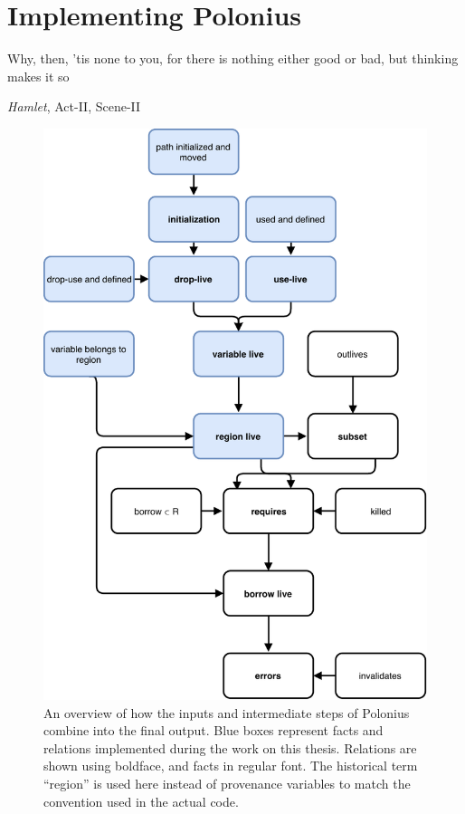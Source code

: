 \documentclass[11pt,a4paper,twoside,openany]{report}
\begin{document}
\chapter{Implementing Polonius}\label{cha:implementation}

\epigraph{Why, then, 'tis none to you, for there is nothing either good or bad,
  but thinking makes it so}%
{\textit{Hamlet}, Act-II, Scene-II}

\begin{figure}
  \includegraphics[width=0.9\linewidth]{Graphs/polonius-overview}
  \caption[Flowchart of the Polonius Inputs and Outputs]{An overview of how the
    inputs and intermediate steps of Polonius combine into the final output.
    Blue boxes represent facts and relations implemented during the work on this
    thesis. Relations are shown using boldface, and facts in regular font. The
    historical term ``region'' is used here instead of provenance variables to
    match the convention used in the actual code.}\label{fig:polonius-overview}
\end{figure}
\end{document}
